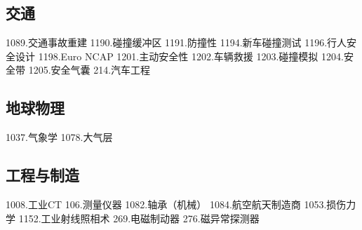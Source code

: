 \subsection{交通}
1089.交通事故重建
1190.碰撞缓冲区
1191.防撞性
1194.新车碰撞测试
1196.行人安全设计
1198.Euro NCAP
1201.主动安全性
1202.车辆救援
1203.碰撞模拟
1204.安全带
1205.安全气囊
214.汽车工程

\subsection{地球物理}
1037.气象学
1078.大气层

\subsection{工程与制造}
1008.工业CT
106.测量仪器
1082.轴承（机械）
1084.航空航天制造商
1053.损伤力学
1152.工业射线照相术
269.电磁制动器
276.磁异常探测器
